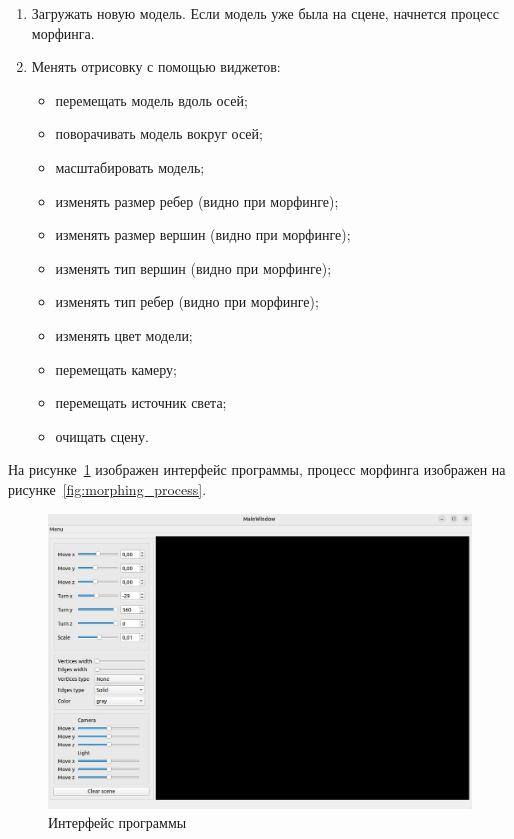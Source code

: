 \begin{enumerate}
	\item Загружать новую модель.
	Если модель уже была на сцене, начнется процесс морфинга.
	\item Менять отрисовку с помощью виджетов:
	
	\begin{itemize}
		\item перемещать модель вдоль осей;
		\item поворачивать модель вокруг осей;
		\item масштабировать модель;
		\item изменять размер ребер (видно при морфинге);
		\item изменять размер вершин (видно при морфинге);
		\item изменять тип вершин (видно при морфинге);
		\item изменять тип ребер (видно при морфинге);
		\item изменять цвет модели;
		\item перемещать камеру;
		\item перемещать источник света;
		\item очищать сцену.
	\end{itemize}
\end{enumerate}

На рисунке~\ref{fig:interface} изображен интерфейс программы, процесс морфинга изображен на рисунке~\ref{fig:morphing_process}.


\begin{figure}[h]
	\centering
	\includegraphics[scale=0.54]{images/interface_programm.jpg}
	\caption{Интерфейс программы}
	\label{fig:interface}
\end{figure}


